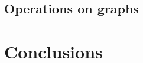 \documentclass[9pt]{entcs} \usepackage{entcsmacro}
\begin{document}
\subsection{Operations on graphs}
\label{sub:35}







\section{Conclusions}\label{sec:conc}





\end{document}
